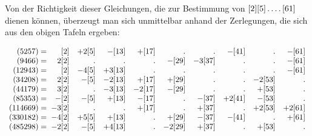 \begingroup\raggedright
\par Von der Richtigkeit dieser Gleichungen, die zur Bestimmung von $[2][5]\mathinner{.\,.\,.\,.}[61]$ dienen können, überzeugt man sich unmittelbar anhand der Zerlegungen, die sich aus den obigen Tafeln ergeben:\par\endgroup
\begingroup\fontsize{10}{13}\selectfont\setlength{\arraycolsep}{1.3pt}
\[
\begin{array}{r@{\;}rrrrrrrrr}
(5257)={} & [2] & +2[5] & -[13] & +[17] & \pdot & \pdot & -[41] & \pdot & -[61] \\
(9466)={} & 2[2] & \pdot & \pdot & \pdot & -[29] & -3[37] & \pdot & \pdot & -[61] \\
(12943)={} & [2] & -4[5] & +3[13] & \pdot & \pdot & \pdot & \pdot & \pdot & -[61] \\
(34208)={} & 2[2] & -[5] & -2[13] & +[17] & +[29] & \pdot & \pdot & -2[53] & \pdot \\
(44179)={} & 3[2] & \pdot & -3[13] & -2[17] & -[29] & \pdot & \pdot & +[53] & \pdot \\
(85353)={} & -[2] & -[5] & +[13] & -[17] & \pdot & -[37] & +2[41] & -[53] & \pdot \\
(114669)={} & -3[2] & \pdot & \pdot & +[17] & \pdot & +[37] & \pdot & +2[53] & +2[61] \\
(330182)={} & -4[2] & +5[5] & +[13] & \pdot & +[29] & -[37] & -[41] & \pdot & +[61] \\
(485298)={} & -2[2] & -[5] & +4[13] & \pdot & -2[29] & +[37] & \pdot & +[53] & \pdot \\
\end{array}
\]
\endgroup
